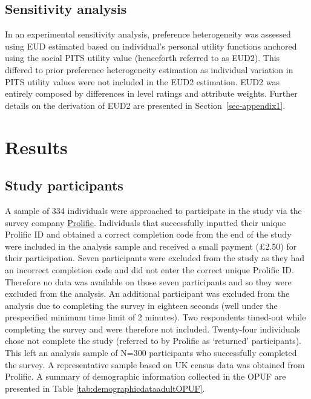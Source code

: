 \documentclass[
  number,
  preprint]{elsarticle}
\begin{document}
\subsection{Sensitivity analysis}\label{sensitivity-analysis}

In an experimental sensitivity analysis, preference heterogeneity was
assessed using EUD estimated based on individual's personal utility
functions anchored using the social PITS utility value (henceforth
referred to as EUD2). This differed to prior preference heterogeneity
estimation as individual variation in PITS utility values were not
included in the EUD2 estimation. EUD2 was entirely composed by
differences in level ratings and attribute weights. Further details on
the derivation of EUD2 are presented in Section~\ref{sec-appendix1}.

\section{Results}\label{results}

\subsection{Study participants}\label{study-participants}

A sample of 334 individuals were approached to participate in the study
via the survey company \href{https://www.prolific.com}{Prolific}.
Individuals that successfully inputted their unique Prolific ID and
obtained a correct completion code from the end of the study were
included in the analysis sample and received a small payment (£2.50) for
their participation. Seven participants were excluded from the study as
they had an incorrect completion code and did not enter the correct
unique Prolific ID. Therefore no data was available on those seven
participants and so they were excluded from the analysis. An additional
participant was excluded from the analysis due to completing the survey
in eighteen seconds (well under the prespecified minimum time limit of 2
minutes). Two respondents timed-out while completing the survey and were
therefore not included. Twenty-four individuals chose not complete the
study (referred to by Prolific as `returned' participants). This left an
analysis sample of N=300 participants who successfully completed the
survey. A representative sample based on UK census data was obtained
from Prolific. A summary of demographic information collected in the
OPUF are presented in Table \ref{tab:demographicdataadultOPUF}.
\end{document}
